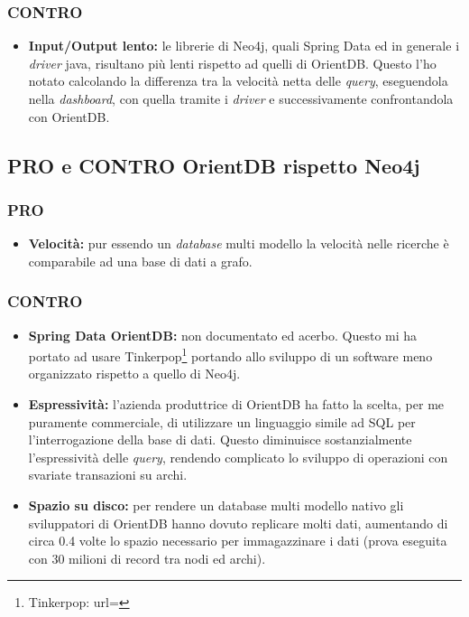 \subsubsection{CONTRO}
\begin{itemize}
\item{\textbf{Input/Output lento:}} le librerie di Neo4j, quali Spring Data ed in generale i \textit{driver} java, risultano più lenti rispetto ad quelli di OrientDB. Questo l'ho notato calcolando la differenza tra la velocità netta delle \textit{query}, eseguendola nella \textit{dashboard}, con quella tramite i \textit{driver} e successivamente confrontandola con OrientDB.
\end{itemize}
\subsection{PRO e CONTRO OrientDB rispetto Neo4j}
\subsubsection{PRO}
\begin{itemize}
\item{\textbf{Velocità:}} pur essendo un \textit{database} multi modello la velocità nelle ricerche è comparabile ad una base di dati a grafo.
\end{itemize}
\subsubsection{CONTRO}
\begin{itemize}
\item{\textbf{Spring Data OrientDB:}} non documentato ed acerbo. Questo mi ha portato ad usare Tinkerpop\footnote{Tinkerpop: url= } portando allo sviluppo di un software meno organizzato rispetto a quello di Neo4j.
\item{\textbf{Espressività:}} l'azienda produttrice di OrientDB ha fatto la scelta, per me puramente commerciale, di utilizzare un linguaggio simile ad \gls{SQL} per l'interrogazione della base di dati. Questo diminuisce sostanzialmente l'espressività delle \textit{query}, rendendo complicato lo sviluppo di operazioni con svariate transazioni su archi.
\item{\textbf{Spazio su disco:}} per rendere un database multi modello nativo gli sviluppatori di OrientDB hanno dovuto replicare molti dati, aumentando di circa 0.4 volte lo spazio necessario per immagazzinare i dati (prova eseguita con 30 milioni di record tra nodi ed archi).
\end{itemize}

